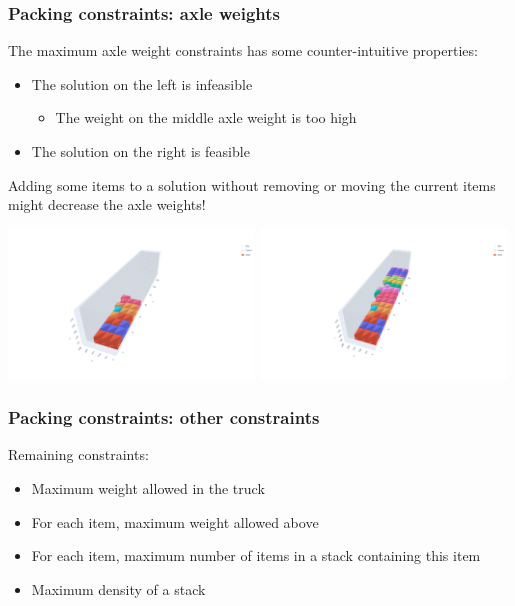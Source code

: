 \documentclass[10pt]{beamer}
\begin{document}
\begin{frame}
  \frametitle{Packing constraints: axle weights}

  The maximum axle weight constraints has some counter-intuitive properties:
  \begin{itemize}
    \item The solution on the left is infeasible
      \begin{itemize}
        \item The weight on the middle axle weight is too high
      \end{itemize}
    \item The solution on the right is feasible
  \end{itemize}
  Adding some items to a solution without removing or moving the current items might decrease the axle weights!

  \begin{center}
    \includegraphics[trim=200 100 300 100,clip,width=0.49\textwidth]{img/axle_weight_infeasible.png}
    \includegraphics[trim=200 100 300 100,clip,width=0.49\textwidth]{img/axle_weight_feasible.png}
  \end{center}
  
\end{frame}

\begin{frame}
  \frametitle{Packing constraints: other constraints}

  Remaining constraints:
  \begin{itemize}
    \item Maximum weight allowed in the truck
    \item For each item, maximum weight allowed above
    \item For each item, maximum number of items in a stack containing this item
    \item Maximum density of a stack
  \end{itemize}
  
\end{frame}
\end{document}
